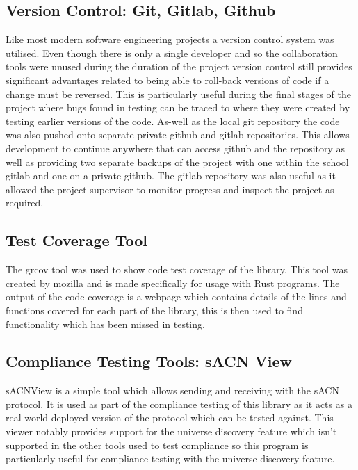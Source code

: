 \documentclass[11pt,a4paper]{article}
\begin{document}
\subsection{Version Control: Git, Gitlab, Github}
Like most modern software engineering projects a version control system was utilised. Even though there is only a single developer and so the collaboration tools were unused during the duration of the project version control still provides significant advantages related to being able to roll-back versions of code if a change must be reversed. This is particularly useful during the final stages of the project where bugs found in testing can be traced to where they were created by testing earlier versions of the code. As-well as the local git repository the code was also pushed onto separate private github and gitlab repositories. This allows development to continue anywhere that can access github and the repository as well as providing two separate backups of the project with one within the school gitlab and one on a private github. The gitlab repository was also useful as it allowed the project supervisor to monitor progress and inspect the project as required.

\subsection{Test Coverage Tool}
The grcov \cite{GRCOV} tool was used to show code test coverage of the library. This tool was created by mozilla and is made specifically for usage with Rust programs. The output of the code coverage is a webpage which contains details of the lines and functions covered for each part of the library, this is then used to find functionality which has been missed in testing. 

\subsection{Compliance Testing Tools: sACN View}
sACNView \cite{SACN_VIEW} is a simple tool which allows sending and receiving with the sACN protocol. It is used as part of the compliance testing of this library as it acts as a real-world deployed version of the protocol which can be tested against. This viewer notably provides support for the universe discovery feature which isn't supported in the other tools used to test compliance so this program is particularly useful for compliance testing with the universe discovery feature.\\
\end{document}
